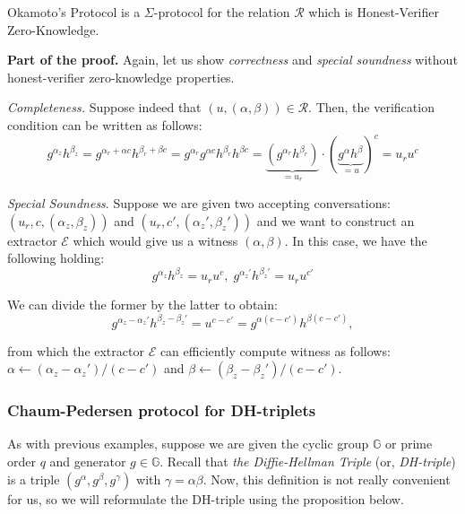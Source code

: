 \documentclass[../../book.tex]{subfiles}
\begin{document}
\begin{theorem}
    Okamoto's Protocol is a $\Sigma$-protocol for the relation $\mathcal{R}$ which is Honest-Verifier Zero-Knowledge.
\end{theorem}

\textbf{Part of the proof.} Again, let us show \textit{correctness} and \textit{special soundness} without honest-verifier zero-knowledge properties.

\textit{Completeness.} Suppose indeed that $(u,(\alpha,\beta)) \in \mathcal{R}$. Then, the verification condition can be written as follows:
\begin{equation*}
    g^{\alpha_z}h^{\beta_z} = g^{\alpha_r + \alpha c}h^{\beta_r + \beta c} = g^{\alpha_r}g^{\alpha c}h^{\beta_r}h^{\beta c} = \underbrace{(g^{\alpha_r}h^{\beta_r})}_{=u_r} \cdot (\underbrace{g^{\alpha}h^{\beta}}_{=u})^c = u_r u^c
\end{equation*}

\textit{Special Soundness}. Suppose we are given two accepting conversations: $(u_r,c,(\alpha_z,\beta_z))$ and $(u_r,c',(\alpha_z',\beta_z'))$ and we want to construct an extractor $\mathcal{E}$ which would give us a witness $(\alpha,\beta)$. In this case, we have the following holding:
\begin{equation*}
    g^{\alpha_z}h^{\beta_z} = u_r u^c, \; g^{\alpha_z'}h^{\beta_z'} = u_r u^{c'}
\end{equation*}

We can divide the former by the latter to obtain:
\begin{equation*}
    g^{\alpha_z - \alpha_z'}h^{\beta_z - \beta_z'} = u^{c-c'} = g^{\alpha(c-c')}h^{\beta(c-c')},
\end{equation*}

from which the extractor $\mathcal{E}$ can efficiently compute witness as follows: $\alpha \gets (\alpha_z - \alpha_z')\big/(c-c')$ and $\beta \gets (\beta_z - \beta_z')\big/(c-c')$.

\subsubsection{Chaum-Pedersen protocol for DH-triplets}

As with previous examples, suppose we are given the cyclic group $\mathbb{G}$ or prime order $q$ and generator $g \in \mathbb{G}$. Recall that \textit{the Diffie-Hellman Triple} (or, \textit{DH-triple}) is a triple $(g^{\alpha},g^{\beta},g^{\gamma})$ with $\gamma=\alpha\beta$. Now, this definition is not really convenient for us, so we will reformulate the DH-triple using the proposition below.
\end{document}
